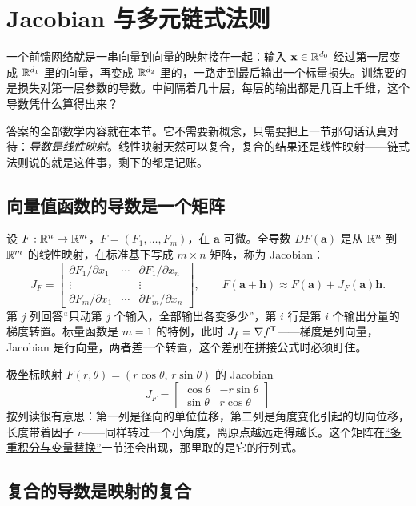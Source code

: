 \section{Jacobian 与多元链式法则}
\label{sec:02-Calculus/06-Multivariable-Calculus/04}

一个前馈网络就是一串向量到向量的映射接在一起：输入 \(\mathbf x\in\mathbb{R}^{d_0}\) 经过第一层变成 \(\mathbb{R}^{d_1}\) 里的向量，再变成 \(\mathbb{R}^{d_2}\) 里的，一路走到最后输出一个标量损失。训练要的是损失对第一层参数的导数。中间隔着几十层，每层的输出都是几百上千维，这个导数凭什么算得出来？

答案的全部数学内容就在本节。它不需要新概念，只需要把上一节那句话认真对待：\emph{导数是线性映射}。线性映射天然可以复合，复合的结果还是线性映射——链式法则说的就是这件事，剩下的都是记账。

\subsection{向量值函数的导数是一个矩阵}

设 \(F:\mathbb{R}^n\to\mathbb{R}^m\)，\(F=(F_1,\dots,F_m)\)，在 \(\mathbf a\) 可微。全导数 \(DF(\mathbf a)\) 是从 \(\mathbb{R}^n\) 到 \(\mathbb{R}^m\) 的线性映射，在标准基下写成 \(m\times n\) 矩阵，称为 Jacobian：
\[
J_F=
\begin{bmatrix}
\partial F_1/\partial x_1&\cdots&\partial F_1/\partial x_n\\
\vdots&&\vdots\\
\partial F_m/\partial x_1&\cdots&\partial F_m/\partial x_n
\end{bmatrix},
\qquad
F(\mathbf a+\mathbf h)\approx F(\mathbf a)+J_F(\mathbf a)\mathbf h .
\]
第 \(j\) 列回答``只动第 \(j\) 个输入，全部输出各变多少''，第 \(i\) 行是第 \(i\) 个输出分量的梯度转置。标量函数是 \(m=1\) 的特例，此时 \(J_f=\nabla f^{\mathsf{T}}\)——梯度是列向量，Jacobian 是行向量，两者差一个转置，这个差别在拼接公式时必须盯住。

极坐标映射 \(F(r,\theta)=(r\cos\theta,\,r\sin\theta)\) 的 Jacobian
\[
J_F=
\begin{bmatrix}
\cos\theta&-r\sin\theta\\
\sin\theta&r\cos\theta
\end{bmatrix}
\]
按列读很有意思：第一列是径向的单位位移，第二列是角度变化引起的切向位移，长度带着因子 \(r\)——同样转过一个小角度，离原点越远走得越长。这个矩阵在\hyperref[sec:02-Calculus/06-Multivariable-Calculus/07]{``多重积分与变量替换''}一节还会出现，那里取的是它的行列式。

\subsection{复合的导数是映射的复合}

